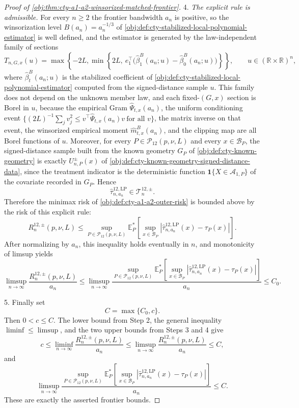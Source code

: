 \documentclass[11pt]{article}
\begin{document}
\begin{proof}[Proof of \cref{obj:thm:cty-a1-a2-winsorized-matched-frontier}]
4. \emph{The explicit rule is admissible.}  For every \(n\ge 2\) the frontier bandwidth \(a_n\) is positive, so the winsorization level \(B(a_n)=a_n^{-1/3}\) of \cref{obj:def:cty-stabilized-local-polynomial-estimator} is well defined, and the estimator is generated by the law-independent family of sections
\[
T_{n,G,x}(u)
=
\max\!\left\{-2L,\min\!\left\{2L,\
e_1^\top\bigl(\widehat\beta^{B}_{1}(a_n;u)-\widehat\beta^{B}_{0}(a_n;u)\bigr)
\right\}\right\},
\qquad u\in(\mathbb R\times\mathbb R)^n,
\]
where \(\widehat\beta^{B}_{t}(a_n;u)\) is the stabilized coefficient of \cref{obj:def:cty-stabilized-local-polynomial-estimator} computed from the signed-distance sample \(u\).  This family does not depend on the unknown member law, and each fixed-\((G,x)\) section is Borel in \(u\), because the empirical Gram \(\widehat\Psi_{t,x}(a_n)\), the uniform conditioning event \(\{(2L)^{-1}\sum_{j}v_j^2\le v^\top\widehat\Psi_{t,x}(a_n)v\ \text{for all }v\}\), the matrix inverse on that event, the winsorized empirical moment \(\widehat m^{B}_{t,x}(a_n)\), and the clipping map are all Borel functions of \(u\).  Moreover, for every \(P\in\mathcal P_{12}(p,\nu,L)\) and every \(x\in\mathcal B_P\), the signed-distance sample built from the known geometry \(G_P\) of \cref{obj:def:cty-known-geometry} is exactly \(U^{\pm}_{n,P}(x)\) of \cref{obj:def:cty-known-geometry-signed-distance-data}, since the treatment indicator is the deterministic function \(\mathbf 1\{X\in\mathcal A_{1,P}\}\) of the covariate recorded in \(G_P\).  Hence
\[
\widehat\tau^{12,\mathrm{LP}}_{n,a_n}\in\mathcal T^{12,\pm}_n .
\]
Therefore the minimax risk of \cref{obj:def:cty-a1-a2-outer-risk} is bounded above by the risk of this explicit rule:
\[
R^{12,\pm}_n(p,\nu,L)
\le
\sup_{P\in\mathcal P_{12}(p,\nu,L)}
\mathbb E_P^*\!\left[
\sup_{x\in\mathcal B_P}
\left|\widehat\tau^{12,\mathrm{LP}}_{n,a_n}(x)-\tau_P(x)\right|
\right].
\]
After normalizing by \(a_n\), this inequality holds eventually in \(n\), and monotonicity of limsup yields
\[
\limsup_{n\to\infty}
\frac{R^{12,\pm}_n(p,\nu,L)}{a_n}
\le
\limsup_{n\to\infty}
\frac{
\sup_{P\in\mathcal P_{12}(p,\nu,L)}
\mathbb E_P^*\!\left[
\sup_{x\in\mathcal B_P}
\left|\widehat\tau^{12,\mathrm{LP}}_{n,a_n}(x)-\tau_P(x)\right|
\right]}
{a_n}
\le C_0 .
\]

5. Finally set
\[
C=\max\{C_0,c\}.
\]
Then \(0<c\le C\).  The lower bound from Step 2, the general inequality
\(\liminf\le\limsup\), and the two upper bounds from Steps 3 and 4 give
\[
c
\le
\liminf_{n\to\infty}\frac{R^{12,\pm}_n(p,\nu,L)}{a_n}
\le
\limsup_{n\to\infty}\frac{R^{12,\pm}_n(p,\nu,L)}{a_n}
\le
C,
\]
and
\[
\limsup_{n\to\infty}
\frac{
\sup_{P\in\mathcal P_{12}(p,\nu,L)}
\mathbb E_P^*\!\left[
\sup_{x\in\mathcal B_P}
\left|\widehat\tau^{12,\mathrm{LP}}_{n,a_n}(x)-\tau_P(x)\right|
\right]}
{a_n}
\le
C.
\]
These are exactly the asserted frontier bounds.
\end{proof}




\end{document}
